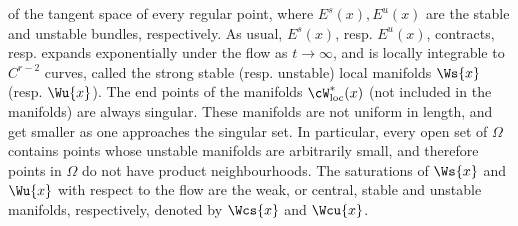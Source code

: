 \documentclass[reqno,11pt]{amsart}
\begin{document}
of the tangent space of every regular point, where \(E^s(x), E^u(x)\) are the stable and unstable bundles, respectively.
As usual, \(E^s(x)\), resp. $E^u(x)$, contracts, resp. expands exponentially under the flow as \(t \to \infty\), and is locally integrable to \(C^{r-2}\) curves, called the strong stable (resp. unstable) local manifolds \(\Ws{x}\) (resp. \(\Wu{x}\)).
The end points of the manifolds \(\cW_{\mathrm{loc}}^*(x)\) (not included in the manifolds) are always singular.
These manifolds are not uniform in length, and get smaller as one approaches the singular set.
In particular, every open set of \(\Omega\) contains points whose unstable manifolds are arbitrarily small, and therefore points in \(\Omega\) do not have product neighbourhoods.
The saturations of \(\Ws{x}\) and \(\Wu{x}\) with respect to the flow are the weak, or central, stable  and unstable manifolds, respectively, denoted by \(\Wcs{x}\) and \(\Wcu{x}\).
\end{document}
